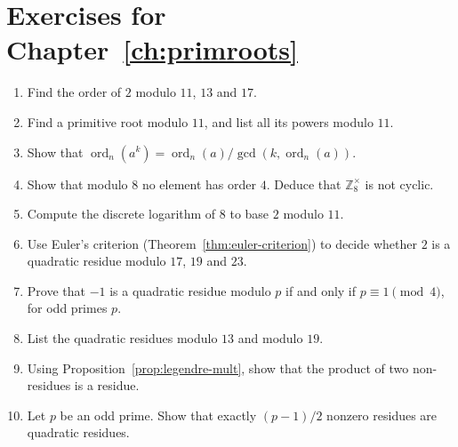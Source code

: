 \section*{Exercises for Chapter~\ref{ch:primroots}}

\begin{enumerate}
  \item Find the order of $2$ modulo $11$, $13$ and $17$.
  \item Find a primitive root modulo $11$, and list all its powers modulo $11$.
  \item Show that $\operatorname{ord}_n(a^k)=\operatorname{ord}_n(a)/\gcd(k,\operatorname{ord}_n(a))$.
  \item Show that modulo $8$ no element has order $4$. Deduce that $\mathbb{Z}_8^{\times}$ is not cyclic.
  \item Compute the discrete logarithm of $8$ to base $2$ modulo $11$.
  \item Use Euler's criterion (Theorem~\ref{thm:euler-criterion}) to decide whether $2$ is a quadratic residue modulo $17$, $19$ and $23$.
  \item Prove that $-1$ is a quadratic residue modulo $p$ if and only if $p\equiv 1\pmod 4$, for odd primes $p$.
  \item List the quadratic residues modulo $13$ and modulo $19$.
  \item Using Proposition~\ref{prop:legendre-mult}, show that the product of two non-residues is a residue.
  \item Let $p$ be an odd prime. Show that exactly $(p-1)/2$ nonzero residues are quadratic residues.
\end{enumerate}
